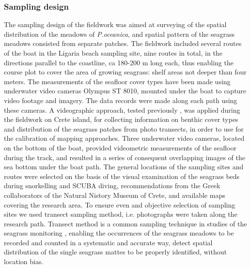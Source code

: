 \documentclass[10pt, a4paper]{article}
\begin{document}
\newpage

\subsubsection{Sampling design}
The sampling design of the fieldwork was aimed at surveying of the spatial distribution of the
meadows of \textit{P.oceanica}, and spatial pattern of the seagrass meadows consisted from separate
patches. The fieldwork included several routes of the boat in the Ligaria beach sampling site, nine
routes in total, in the directions parallel to the coastline, ca 180-200 m long each, thus enabling the
course plot to cover the area of growing seagrass: shelf areas not deeper than four meters.
The measurements of the seafloor cover types have been made using underwater video cameras
Olympus ST 8010, mounted under the boat to capture video footage and imagery. The data records
were made along each path using these cameras. A videographic approach, tested previously \cite{Norris97}\label{Norris97},
 was applied during the fieldwork on Crete island, for collecting information on benthic cover types and
distribution of the seagrass patches from photo transects, in order to use for the calibration of mapping approaches.
Three underwater video cameras, located on the bottom of the boat, provided videometric measurements of the
seafloor during the track, and resulted in a series of consequent overlapping images of the sea bottom under the
boat path. The general locations of the sampling sites and routes were selected on the basis of the visual examination
of the seagrass beds during snorkelling and SCUBA diving, recommendations from the Greek collaborators of the Natural Nistory Museum of Crete, and available maps covering the research area. To ensure even and objective selection of sampling sites
we used transect sampling method, i.e. photographs were taken along the research path. Transect
method is a common sampling technique in studies of the seagrass monitoring \cite{Shortis07}\label{Shortis07},
enabling the occurrences of the seagrass meadows to be recorded and counted in a systematic and
accurate way, detect spatial distribution of the single seagrass mattes to be properly identified,
without location bias. 
\end{document}

